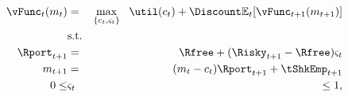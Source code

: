   \begin{eqnarray*}
    {\vFunc}_{t}({m}_{t}) & = & \max_{\{{c}_{t},\varsigma_{t}\}}   ~~ \util({c}_{t}) +  \Discount
                                \Ex_{t}[{\vFunc}_{t+1}({m}_{t+1})]
    \\      & \text{s.t.} & \nonumber
    \\      \Rport_{t+1} & = & \Rfree + (\Risky_{t+1}-\Rfree) \varsigma_{t}
    \\      {m}_{t+1} & = & ({m}_{t}-{c}_{t})\Rport_{t+1} + \tShkEmp_{t+1}
    \\  0       \leq & \varsigma_{t} & \leq 1, \label{eq:noshorts}
  \end{eqnarray*}
